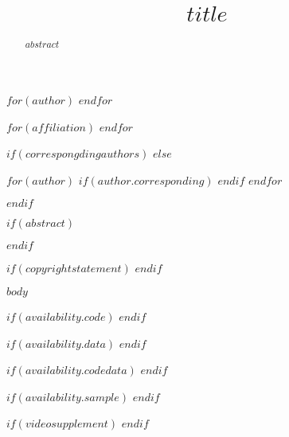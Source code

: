 \documentclass[$journal$, manuscript]{copernicus}
\begin{document}
\title{$title$}


$for(author)$
$endfor$


$for(affiliation)$
$endfor$



$if(correspongdingauthors)$
$else$

$for(author)$
$if(author.corresponding)$
$endif$
$endfor$

$endif$


\received{}
\pubdiscuss{} %
\revised{}
\accepted{}
\published{}




\maketitle


$if(abstract)$
\begin{abstract}
$abstract$
\end{abstract}
$endif$


$if(copyrightstatement)$
$endif$


$body$


$if(availability.code)$
$endif$

$if(availability.data)$
$endif$

$if(availability.codedata)$
$endif$

$if(availability.sample)$
$endif$

$if(videosupplement)$
$endif$

\end{document}
